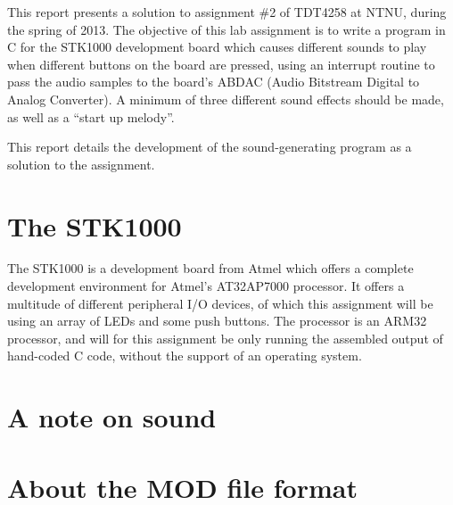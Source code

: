 This report presents a solution to assignment \#2 of TDT4258 at NTNU, during the spring of 2013.
The objective of this lab assignment is to write a program in C for the STK1000 development board which causes different sounds to play when different buttons on the board are pressed, using an interrupt routine to pass the audio samples to the board's ABDAC (Audio Bitstream Digital to Analog Converter).
A minimum of three different sound effects should be made, as well as a ``start up melody''.

This report details the development of the sound-generating program as a solution to the assignment.
\section{The STK1000}
	The STK1000 is a development board from Atmel which offers a complete development environment for Atmel's AT32AP7000 processor.
	It offers a multitude of different peripheral I/O devices, of which this assignment will be using an array of LEDs and some push buttons.
	The processor is an ARM32 processor, and will for this assignment be only running the assembled output of hand-coded C code, without the support of an operating system.

\section{A note on sound}
	


\section{About the MOD file format}
	

